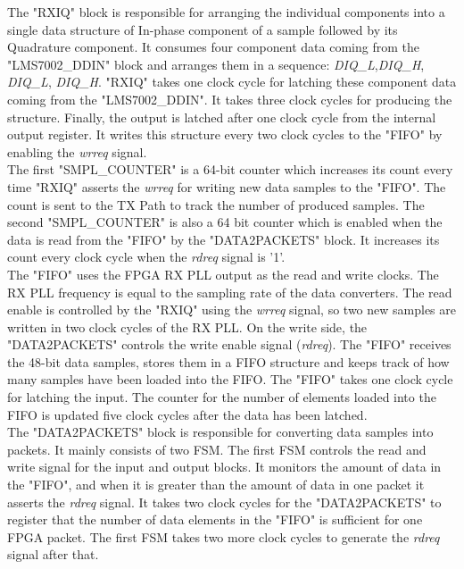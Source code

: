 The "RXIQ" block is responsible for arranging the individual components into a single data structure of In-phase component of a sample followed by its Quadrature component.
It consumes four component data coming from the "LMS7002\_DDIN" block and arranges them in a sequence: \textit{DIQ\_L},\textit{DIQ\_H}, \textit{DIQ\_L}, \textit{DIQ\_H}.
"RXIQ" takes one clock cycle for latching these component data coming from the "LMS7002\_DDIN".
It takes three clock cycles for producing the structure.
Finally, the output is latched after one clock cycle from the internal output register.
It writes this structure every two clock cycles to the "FIFO" by enabling the \textit{wrreq} signal.\\

The first "SMPL\_COUNTER" is a 64-bit counter which increases its count every time "RXIQ" asserts the \textit{wrreq} for writing new data samples to the "FIFO". 
The count is sent to the TX Path to track the number of produced samples. 
The second "SMPL\_COUNTER" is also a 64 bit counter which is enabled when the data is read from the "FIFO" by the "DATA2PACKETS" block.
It increases its count every clock cycle when the \textit{rdreq} signal is '1'.\\

The "FIFO" uses the FPGA RX \ac{PLL} output as the read and write clocks.
The RX PLL frequency is equal to the sampling rate of the data converters.
The read enable is controlled by the "RXIQ" using the \textit{wrreq} signal, so two new samples are written in two clock cycles of the RX PLL.
On the write side, the "DATA2PACKETS" controls the write enable signal (\textit{rdreq}).
The "FIFO" receives the 48-bit data samples, stores them in a \ac{FIFO} structure and keeps track of how many samples have been loaded into the \ac{FIFO}.
The "FIFO" takes one clock cycle for latching the input.
The counter for the number of elements loaded into the FIFO is updated five clock cycles after the data has been latched.
\\

The "DATA2PACKETS" block is responsible for converting data samples into packets.
It mainly consists of two \ac{FSM}.
The first  \ac{FSM} controls the read and write signal for the input and output blocks.
It monitors the amount of data in the "FIFO", and when it is greater than the amount of data in one packet it asserts the \textit{rdreq} signal.
It takes two clock cycles for the "DATA2PACKETS" to register that the number of data elements in the "FIFO" is sufficient for one \ac{FPGA} packet.
The first \ac{FSM} takes two more clock cycles to generate the \textit{rdreq} signal after that.\\ 

